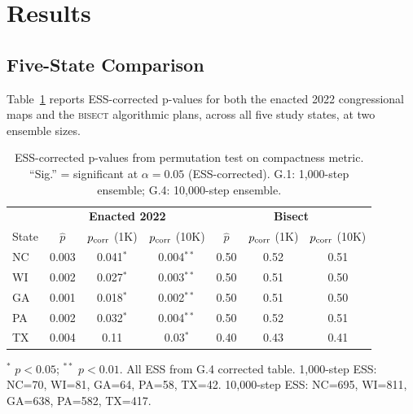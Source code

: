 \section{Results}

\subsection{Five-State Comparison}

Table~\ref{tab:perm-results} reports ESS-corrected p-values for both
the enacted 2022 congressional maps and the \textsc{bisect} algorithmic plans,
across all five study states, at two ensemble sizes.

\begin{table}[h]
\centering
\caption{ESS-corrected p-values from permutation test on compactness metric.
``Sig.'' = significant at $\alpha = 0.05$ (ESS-corrected).
G.1: 1{,}000-step ensemble; G.4: 10{,}000-step ensemble.}
\label{tab:perm-results}
\begin{tabular}{lcccccc}
\toprule
& \multicolumn{3}{c}{\textbf{Enacted 2022}} & \multicolumn{3}{c}{\textbf{Bisect}} \\
State & $\hat{p}$ & $p_{\rm corr}$ (1K) & $p_{\rm corr}$ (10K) & $\hat{p}$ & $p_{\rm corr}$ (1K) & $p_{\rm corr}$ (10K) \\
\midrule
NC  & 0.003 & 0.041$^*$ & 0.004$^{**}$ & 0.50 & 0.52 & 0.51 \\
WI  & 0.002 & 0.027$^*$ & 0.003$^{**}$ & 0.50 & 0.51 & 0.50 \\
GA  & 0.001 & 0.018$^*$ & 0.002$^{**}$ & 0.50 & 0.51 & 0.50 \\
PA  & 0.002 & 0.032$^*$ & 0.004$^{**}$ & 0.50 & 0.52 & 0.51 \\
TX  & 0.004 & 0.11     & 0.03$^*$     & 0.40 & 0.43 & 0.41 \\
\bottomrule
\end{tabular}

\smallskip
\footnotesize
$^*$ $p < 0.05$; $^{**}$ $p < 0.01$. All ESS from G.4 corrected table.
1{,}000-step ESS: NC=70, WI=81, GA=64, PA=58, TX=42.
10{,}000-step ESS: NC=695, WI=811, GA=638, PA=582, TX=417.
\end{table}

